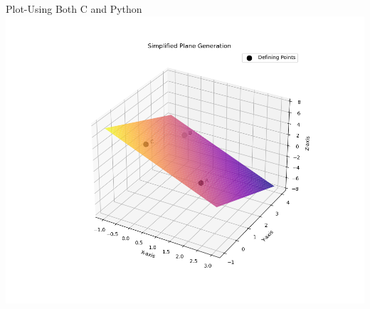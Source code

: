 \documentclass{beamer}
\begin{document}
\begin{frame}{Plot-Using Both C and Python}
    \centering
    \includegraphics[width=\columnwidth, height=0.8\textheight, keepaspectratio]{figs/plane.png}     
\end{frame}
\end{document}
